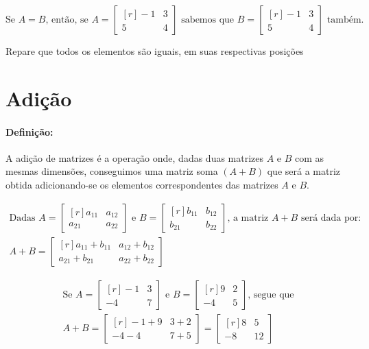 \Example

$$
\text{Se } A=B \text{, então, se } A=\begin{bmatrix*}[r]
-1 & 3 \\
5 & 4
\end{bmatrix*} \text{ sabemos que } B =\begin{bmatrix*}[r]
-1 & 3 \\
5 & 4
\end{bmatrix*} \text{ também.}
$$
\centerline{\footnotesize{Repare que todos os elementos são iguais, em suas respectivas posições}}

\section{Adição}

\paragraph{Definição:}

A adição de matrizes é a operação onde, dadas duas matrizes $A$ e $B$ com as mesmas dimensões, conseguimos uma matriz soma $(A+B)$ que será a matriz obtida adicionando-se os elementos correspondentes das matrizes $A$ e $B$.

\Example

\begin{gather*}
    \text{Dadas } A=\begin{bmatrix*}[r]
    a_{11} & a_{12} \\
    a_{21} & a_{22}
    \end{bmatrix*}
    \text{ e } B=\begin{bmatrix*}[r]
    b_{11} & b_{12} \\
    b_{21} & b_{22}
    \end{bmatrix*}
    \text{, a matriz } A+B \text{ será dada por:} \\
    A+B=\begin{bmatrix*}[r]
    a_{11} + b_{11} & a_{12} + b_{12} \\
    a_{21} + b_{21} & a_{22} + b_{22}
    \end{bmatrix*}    
\end{gather*}

\Example

\begin{gather*}
    \text{Se } A=\begin{bmatrix*}[r]
    -1 & 3 \\
    -4 & 7
    \end{bmatrix*} \text{ e } B =\begin{bmatrix*}[r]
    9 & 2\\
    -4 & 5
    \end{bmatrix*} \text{, segue que} \\
    A+B=\begin{bmatrix*}[r]
    -1+9 & 3+2 \\
    -4-4 & 7+5
    \end{bmatrix*}=\begin{bmatrix*}[r]
    8 & 5 \\
    -8 & 12
    \end{bmatrix*}
\end{gather*}

